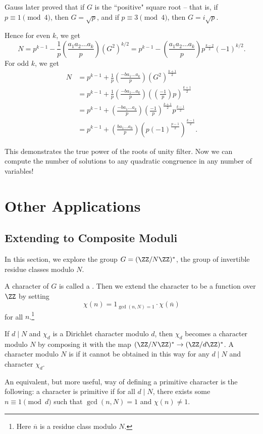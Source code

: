 \documentclass{scrartcl}
\begin{document}
\begin{remark}
	Gauss later proved that if $G$ is the ``positive" square root -- that is, if 
	$p\equiv 1\pmod 4$, then $G = \sqrt{p}$, and if $p\equiv 3\pmod 4$, then $G = i\sqrt{p}.$
\end{remark}

Hence for even $k$, we get
$$N = p^{k-1}-\frac{1}{p}\left(\frac{a_1a_2\dots a_k}p\right)(G^2)^{k/2} = 
p^{k-1}-\left(\frac{a_1a_2\dots a_k}p\right)p^{\frac{k-2}{2}}(-1)^{k/2}.$$
For odd $k$, we get
\begin{align*}
	N &= p^{k-1}+\frac{1}{p}\left(\frac{-ba_1\dots a_k}{p}\right)(G^2)^{\frac{k+1}{2}} \\
	&= p^{k-1}+\frac{1}{p}\left(\frac{-ba_1\dots a_k}{p}\right)\left((\tfrac{-1}{p})p\right)^{\frac{k+1}{2}} \\
	&= p^{k-1}+\left(\frac{-ba_1\dots a_k}p\right) \left(\frac{-1}{p}\right)^{\frac{k+1}{2}} p^{\frac{k-1}{2}} \\
	&= p^{k-1}+\left(\frac{ba_1\dots a_k}p\right) \left(p(-1)^{\frac{p-1}{2}}\right)^{\frac{k-1}{2}}.
\end{align*}

This demonstrates the true power of the roots of unity filter. 
Now we can compute the number of solutions to any quadratic congruence in any number of variables!

\section{Other Applications}

\subsection{Extending to Composite Moduli}

In this section, we explore the group $G = (\ZZ/N\ZZ)^\ast$, the group of invertible residue classes 
modulo $N$. 

\begin{definition}
	A character of $G$ is called a . 
	Then we extend the character to be a function over $\ZZ$ by setting 
	$$\chi(n) = 1_{\gcd(n, N)=1} \cdot \chi(\overline{n})$$ for all $n$.\footnote{
	Here $\overline{n}$ is a residue class modulo $N$.}
\end{definition}

\begin{definition}
	If $d\mid N$ and $\chi_d$ is a Dirichlet character modulo $d$, then $\chi_d$ becomes a 
	character modulo $N$ by composing it with the map $(\ZZ/N\ZZ)^\ast \rightarrow (\ZZ/d\ZZ)^\ast$. 
	A character modulo $N$ is  if it cannot be obtained in this way for any 
	$d\mid N$ and character $\chi_d$. 
	
	An equivalent, but more useful, way of defining a primitive character is the following: 
	a character is primitive if for all $d\mid N$, there exists some $n\equiv 1\pmod d$ such that 
	$\gcd(n, N)=1$ and $\chi(n)\neq 1$. 
\end{definition}
\end{document}
